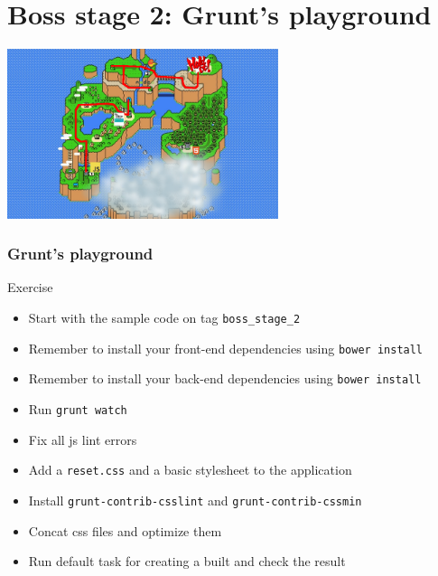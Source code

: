 \section{Boss stage 2: Grunt's playground}

\begin{frame}[fragile]
  \begin{center}
    \includegraphics[width=300px]{images/map_boss_stage_2.png}
  \end{center}
\end{frame}

\begin{frame}[fragile]
  \frametitle{Grunt's playground}
  \begin{block}{Exercise}
    \begin{itemize}
      \item Start with the sample code on tag \texttt{boss\_stage\_2}
      \item Remember to install your front-end dependencies using \texttt{bower install}
      \item Remember to install your back-end dependencies using \texttt{bower install}
      \item Run \texttt{grunt watch}
      \item Fix all js lint errors
      \item Add a \texttt{reset.css} and a basic stylesheet to the application
      \item Install \texttt{grunt-contrib-csslint} and \texttt{grunt-contrib-cssmin}
      \item Concat css files and optimize them
      \item Run default task for creating a built and check the result
    \end{itemize}
  \end{block}
\end{frame}
